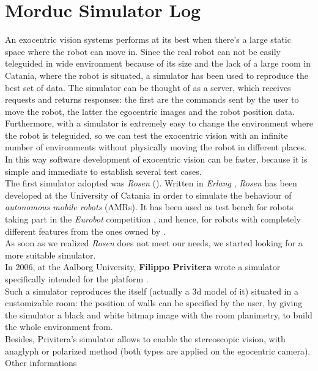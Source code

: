 \section{Morduc Simulator Log}
\label{log:morduc_simulator}

An exocentric vision systems performs at its best 
when there's a large static space where the robot can move in. Since 
the real robot can not be easily teleguided in wide 
environment because of its size and the lack of a large 
room in Catania, where the robot is situated, a simulator 
has been used to reproduce the best set of data. The 
simulator can be thought of as a server, which receives 
requests and returns responses: the first are the commands 
sent by the user to move the robot, the latter the 
egocentric images and the robot position data.
\\
Furthermore, with a simulator is extremely easy to 
change the environment where the robot is teleguided, 
so we can test the exocentric vision with an infinite 
number of environments without physically moving the 
robot in different places. In this way software 
development of exocentric vision can be faster, because 
it is simple and immediate to establish several test cases.
\\
The first simulator adopted was \textit{Rosen} (\cite{rosen}). Written in 
\textit{Erlang} \cite{erlang}, \textit{Rosen} has been developed at
the University of Catania in order to simulate the behaviour of
\textit{autonomous mobile robots} (AMRs). It has been used as
test bench for robots taking part in 
the \textit{Eurobot} competition \cite{eurobot}, and hence, 
for robots with completely different features from the ones
owned by \morduc{}. 
\\
As soon as we realized \textit{Rosen} does not meet our needs, 
we started looking for a more suitable simulator.
\\
In 2006, at the Aalborg University, \textbf{Filippo 
Privitera} wrote a simulator specifically intended for 
the \morduc{} platform \cite{privitera}. 
\\
Such a simulator reproduces the \morduc{} itself (actually a 
3d model of it) situated in a customizable room: the position 
of walls can be specified by the user, by giving 
the simulator a black and white bitmap image with the room 
planimetry, to build the whole environment from. 
\\
Besides, Privitera's simulator allows to enable the 
stereoscopic vision, with anaglyph or polarized method (both 
types are applied on the egocentric camera). Other informations 
